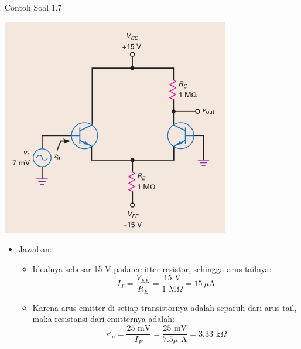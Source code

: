 \documentclass[aspectratio=169]{beamer}
\begin{document}
\begin{frame}{Contoh Soal 1.7}
	\begin{multicols}{2}
		\begin{center}
			\includegraphics[height=0.7\textheight]{gambar/01.contoh_soal_07}
		\end{center}
		\columnbreak
		\begin{itemize}
			\item Jawaban:
			\begin{itemize}
				\item Idealnya sebesar 15 V pada emitter resistor, sehingga arus tailnya:
				\[ I_T = \frac{V_{EE}}{R_E} = \frac{15 \text{ V}}{1 \text{ M}\Omega} = 15~\mu\text{A} \]
				\item Karena arus emitter di setiap transistornya adalah separuh dari arus tail, maka resistansi dari emitternya adalah:
				\[ r'_e = \frac{25 \text{ mV}}{ I_E} =\frac{25 \text{ mV}}{7.5 \mu\text{ A}} = 3.33 \text{ k}\Omega \]
			\end{itemize}
		\end{itemize}
	\end{multicols}
\end{frame}
\end{document}
